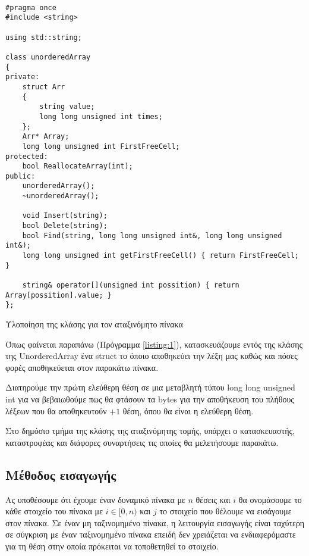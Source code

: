 \en
\begin{listing}[ht]
\begin{verbatim}

#pragma once
#include <string>

using std::string;

class unorderedArray
{
private:
    struct Arr
    {
        string value;
        long long unsigned int times;
    };
    Arr* Array;
    long long unsigned int FirstFreeCell;
protected:
    bool ReallocateArray(int);
public:
    unorderedArray();
    ~unorderedArray();
    
    void Insert(string);  
    bool Delete(string);
    bool Find(string, long long unsigned int&, long long unsigned int&);
    long long unsigned int getFirstFreeCell() { return FirstFreeCell; }

    string& operator[](unsigned int possition) { return Array[possition].value; }
};

\end{verbatim}
\caption{Υλοποίηση της κλάσης για τον αταξινόμητο πίνακα}
\label{listing:1}
\end{listing}
\gr


Όπως φαίνεται παραπάνω (Πρόγραμμα \ref{listing:1}), κατασκευάζουμε εντός της κλάσης της \en UnorderedArray \gr ένα \en struct \gr το όποιο αποθηκεύει την λέξη μας καθώς και πόσες φορές αποθηκεύεται στον παρακάτω πίνακα.

Διατηρούμε την πρώτη ελεύθερη θέση σε μια μεταβλητή τύπου \en long long unsigned int \gr για να βεβαιωθούμε πως θα φτάσουν τα \en bytes \gr για την αποθήκευση του πλήθους λέξεων που θα αποθηκευτούν $+1$ θέση, όπου θα είναι η ελεύθερη θέση.

Στο δημόσιο τμήμα της κλάσης της αταξινόμητης τομής, υπάρχει ο κατασκευαστής, καταστροφέας και διάφορες συναρτήσεις τις οποίες θα μελετήσουμε παρακάτω.

\subsection{Μέθοδος εισαγωγής}

Ας υποθέσουμε ότι έχουμε έναν δυναμικό πίνακα με $n$ θέσεις και $i$ θα ονομάσουμε το κάθε στοιχείο του πίνακα με $i\in[0,n)$ και $j$ το στοιχείο που θέλουμε να εισάγουμε στον πίνακα. Σε έναν μη ταξινομημένο πίνακα, η λειτουργία εισαγωγής είναι ταχύτερη σε σύγκριση με έναν ταξινομημένο πίνακα επειδή δεν χρειάζεται να ενδιαφερόμαστε για τη θέση στην οποία πρόκειται να τοποθετηθεί το στοιχείο.

